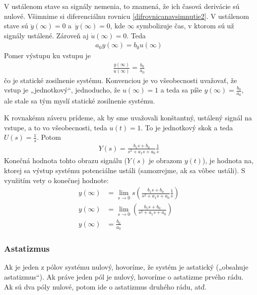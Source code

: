 \documentclass[a4paper, 10pt, ]{article}
\begin{document}
V ustálenom stave sa signály nemenia, to znamená, že ich časová derivácie sú nulové. Všimnime si diferenciálnu rovnicu \eqref{difrovnicanavsimnutie2}. V ustálenom stave sú $\ddot y(\infty) = 0$ a~$\dot y(\infty) = 0$, kde $\infty$ symbolizuje čas, v ktorom sú už signály ustálené. Zároveň aj $\dot u(\infty) = 0$. Teda
\begin{align}
    a_0 y(\infty) =  b_0 u(\infty)
\end{align}
Pomer výstupu ku vstupu je
\begin{align}
    \frac{y(\infty)}{u(\infty)} = \frac{b_0 }{a_0}
\end{align}
čo je statické zosilnenie systému. Konvenciou je vo všeobecnosti uvažovať, že vstup je „jednotkový“, jednoducho, že $u(\infty) = 1$ a teda sa píše $y(\infty) = \frac{b_0 }{a_0}$, ale stale sa tým myslí statické zosilnenie systému.

K rovnakému záveru prídeme, ak by sme uvažovali konštantný, ustálený signál na vstupe, a to vo všeobecnosti, teda $u(t) = 1$. To je jednotkový skok a teda $U(s) = \frac{1}{s}$. Potom
\begin{align}
    Y(s) =  \frac{b_1 s + b_0}{s^2 + a_1 s + a_0} \frac{1}{s}
\end{align}
Konečná hodnota tohto obrazu signálu ($Y(s)$ je obrazom $y(t)$), je hodnota na, ktorej sa výstup systému potenciálne ustáli (samozrejme, ak sa vôbec ustáli). S využitím vety o konečnej hodnote:
\begin{subequations}
\begin{align}
    y(\infty) &= \lim_{s \to 0} s \left(  \frac{b_1 s + b_0}{s^2 + a_1 s + a_0} \frac{1}{s} \right) \\
    y(\infty) &= \lim_{s \to 0} \left(  \frac{b_1 s + b_0}{s^2 + a_1 s + a_0}  \right) \\
    y(\infty) &=  \frac{b_0}{a_0}
\end{align}
\end{subequations}







\subsubsection{Astatizmus}

Ak je jeden z pólov systému nulový, hovoríme, že systém je astatický („obsahuje astatizmus“). Ak práve jeden pól je nulový, hovoríme o astatizme prvého rádu. Ak sú dva póly nulové, potom ide o astatizmus druhého rádu, atď.
\end{document}
